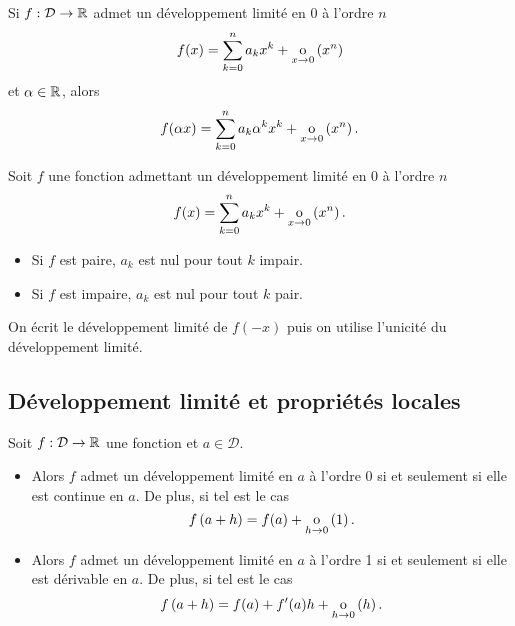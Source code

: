 \documentclass{magnoliaold}
\begin{document}
\begin{remarqueUnique}
\remarque Si $f:\mathcal{D}\to\mathbb{R}$ admet un développement limité en 0 à l'ordre $n$
  \[f(x)=\sum_{k=0}^n a_k x^k+\underset{x \rightarrow 0}{\text{o}}\left(x^n\right)\]
  et $\alpha\in\mathbb{R}$, alors
  \[f(\alpha x)=\sum_{k=0}^n a_k \alpha^k x^k+\underset{x \rightarrow 0}{\text{o}}\left(x^n\right).\]
\end{remarqueUnique}

\begin{proposition}[utile=-3]
Soit $f$ une fonction admettant un développement limité en 0 à l'ordre $n$
\[f(x)=\sum_{k=0}^n a_k x^k+\underset{x \rightarrow 0}{\text{o}}\left(x^n\right).\]
\begin{itemize}
\item Si $f$ est paire, $a_k$ est nul pour tout $k$ impair.
\item Si $f$ est impaire, $a_k$ est nul pour tout $k$ pair.
\end{itemize}
\end{proposition}

\begin{preuve}
On écrit le développement limité de $f(-x)$ puis on utilise l'unicité du développement limité.
\end{preuve}



\subsection{Développement limité et propriétés locales}

\begin{proposition}[utile=-3]
Soit $f:\mathcal{D}\to\mathbb{R}$ une fonction et $a\in\mathcal{D}$.
\begin{itemize}
\item Alors $f$ admet un développement limité en $a$ à l'ordre 0 si et
  seulement si elle est continue en $a$. De plus, si tel est le cas
  \[f\left(a+h\right)=f(a)+\underset{h \rightarrow 0}{\text{o}}\left(1\right).\]
\item Alors $f$ admet un développement limité en $a$ à l'ordre 1 si et
  seulement si elle est dérivable en $a$. De plus, si tel est le cas
  \[f\left(a+h\right)=f(a)+f'(a)h+\underset{h \rightarrow 0}{\text{o}}\left(h\right).\]
\end{itemize}
\end{proposition}
\end{document}
